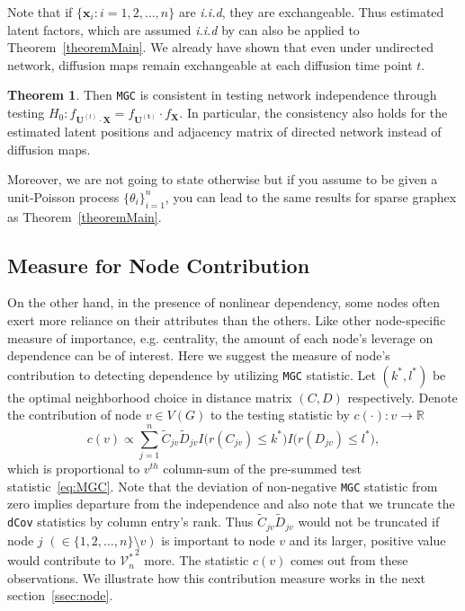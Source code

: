 \documentclass[12pt]{article}
\theoremstyle{definition}
\newtheorem{theorem}{Theorem}[section]
\begin{document}
Note that if $\{ \mathbf{x}_{i} : i = 1,2,\ldots, n \}$ are \textit{i.i.d}, they are exchangeable. Thus estimated latent factors, which are assumed \textit{i.i.d} by \cite{fosdick2015testing} can also be applied to Theorem~\ref{theoremMain}. We already have shown that even under undirected network, diffusion maps remain exchangeable at each diffusion time point $t$. 
\begin{theorem}
	\label{theorem2}
	Then \texttt{MGC} is consistent in testing network independence through testing $H_{0}: f_{\mathbf{U}^{(t)} \cdot \mathbf{X}  }  = f_{\mathbf{U^{(t)}}} \cdot f_{\mathbf{X}}$. In particular, the consistency also holds for the estimated latent positions and adjacency matrix of directed network instead of diffusion maps.
\end{theorem}		
Moreover, we are not going to state otherwise but if you assume to be given a unit-Poisson process $\{ \theta_{i} \}_{i=1}^{n}$, you can lead to the same results for sparse graphex as Theorem~\ref{theoremMain}. 

\subsection{Measure for Node Contribution}

On the other hand, in the presence of nonlinear dependency, some nodes often exert more reliance on their attributes than the others. Like other node-specific measure of importance, e.g. centrality,  the amount of each node's leverage on dependence can be of interest. Here we suggest the measure of node's contribution to detecting dependence by utilizing \texttt{MGC} statistic. Let $(k^{*}, l^{*})$ be the optimal neighborhood choice in distance matrix $(C, D)$ respectively.  Denote the contribution of node $v \in V(G)$ to the testing statistic by  $c(\cdot) : v \rightarrow \mathbb{R}$
\begin{equation}
\label{eq:contribution}
c(v) \propto \sum\limits_{j=1}^{n} \tilde{C}_{j v} \tilde{D}_{j v} I \big(  r (C_{j v}) \leq k^{*}  \big) I \big( r (D_{ j v }) \leq l^{*} \big), 
\end{equation}
which is proportional to $v^{th}$ column-sum of the pre-summed test statistic~\ref{eq:MGC}. Note that the deviation of non-negative \texttt{MGC} statistic from zero implies departure from the independence and also note that we truncate the \texttt{dCov} statistics by column entry's rank. Thus $\tilde{C}_{jv} \tilde{D}_{jv}$ would not be truncated if node $j$ $(\in \{ 1,2, \ldots, n \} \setminus v )$ is important to node $v$ and its larger, positive value would contribute to ${\mathcal{V}^{*}_{n}}^2$ more. The statistic $c(v)$ comes out from these observations. We illustrate how this contribution measure works in the next section~\ref{ssec:node}. 
\end{document}
